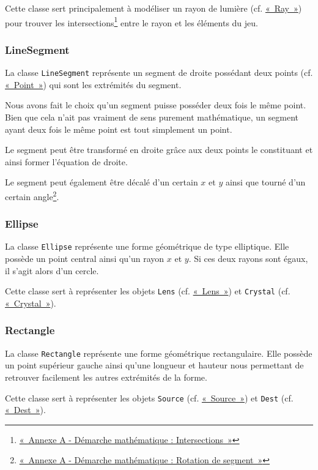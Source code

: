 \documentclass[]{report}
\begin{document}
Cette classe sert principalement à modéliser un rayon de lumière (cf. \hyperref[Ray]{«~Ray~»}) pour trouver 
les intersections\footnote{\hyperref[AnnexeIntersects]{«~Annexe A - Démarche mathématique : Intersections~»}} entre le rayon et les éléments du jeu.

\subsubsection{\label{LineSegment}LineSegment}

La classe \texttt{LineSegment} représente un segment de droite possédant
deux points (cf. \hyperref[Point]{«~Point~»}) qui sont les extrémités du segment.

Nous avons fait le choix qu'un segment puisse posséder deux fois le même point.
Bien que cela n'ait pas vraiment de sens purement mathématique, un segment
ayant deux fois le même point est tout simplement un point.

Le segment peut être transformé en droite grâce aux deux points
le constituant et ainsi former l'équation de droite.

Le segment peut également être décalé d'un certain $ x $ et $ y $ ainsi que tourné 
d'un certain angle\footnote{\hyperref[AnnexeRotation]{«~Annexe A - Démarche mathématique : Rotation de segment~»}}.

\subsubsection{\label{Ellipse}Ellipse}

La classe \texttt{Ellipse} représente une forme géométrique de type elliptique.
Elle possède un point central ainsi qu'un rayon $x$ et $y$. Si ces deux
rayons sont égaux, il s'agit alors d'un cercle.

Cette classe sert à représenter les objets \texttt{Lens} (cf. \hyperref[Lens]{«~Lens~»}) et \texttt{Crystal} (cf. \hyperref[Crystal]{«~Crystal~»}).

\subsubsection{\label{Rectangle}Rectangle}

La classe \texttt{Rectangle} représente une forme géométrique rectangulaire.
Elle possède un point supérieur gauche ainsi qu'une longueur et hauteur 
nous permettant de retrouver facilement les autres extrémités de la 
forme.

Cette classe sert à représenter les objets \texttt{Source} (cf. \hyperref[Source]{«~Source~»}) et \texttt{Dest} (cf. \hyperref[Dest]{«~Dest~»}).
\end{document}
